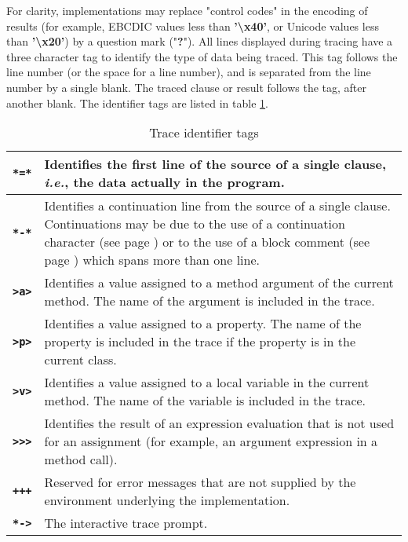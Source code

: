 For clarity, implementations may replace "control codes"
in the encoding of results (for example, EBCDIC values less
than \textbf{'\textbackslash x40'}, or Unicode values less than
\textbf{'\textbackslash x20'})
by a question mark ("\textbf{?}").
 All lines displayed during tracing have a three character tag to
identify the type of data being traced.  This tag follows the line
number (or the space for a line number), and is separated from the line
number by a single blank.
The traced clause or result follows the tag, after another
blank.
The identifier tags are listed in table \ref{table:Trace
    Identifier Tags}.
\begin{table}\caption{Trace identifier tags}\label{table:Trace
    Identifier Tags}
\begin{tabularx}{\textwidth}{>{\bfseries}lX}
\toprule
\texttt{*=*}&
\index{*=* tracing flag,}
Identifies the first line of the source of a single clause, \emph{i.e.},
the data actually in the program.
\\\midrule
\texttt{*-*}&
\index{*-* tracing flag,}
Identifies a continuation line from the source of a single clause.
Continuations may be due to the use of a  continuation character (see page \pageref{refsemis}) 
or to the use of a  block comment (see page \pageref{refblockco}) 
which spans more than one line.
\\\midrule
\texttt{>a>}&
\index{>a> tracing flag,}
Identifies a value assigned to a method argument of the current
method.
The name of the argument is included in the trace.
\\\midrule
\texttt{>p>}&
\index{>p> tracing flag,}
Identifies a value assigned to a property.
The name of the property is included in the trace if the property is in
the current class.
\\\midrule
\texttt{>v>}&
\index{>v> tracing flag,}
Identifies a value assigned to a local variable in the current
method.
The name of the variable is included in the trace.
\\\midrule
\texttt{>>>}&
\index{>>> tracing flag,}
Identifies the result of an expression evaluation that is not used
for an assignment (for example, an argument expression in a method
call).
\\\midrule
\texttt{+++}&
\index{+++ tracing flag,}
Reserved for error messages that are not supplied by the environment
underlying the implementation.
\\\midrule
\texttt{*->}&
\index{*-> tracing flag,}
The interactive trace prompt.
\\\bottomrule
\end{tabularx}
\end{table}



